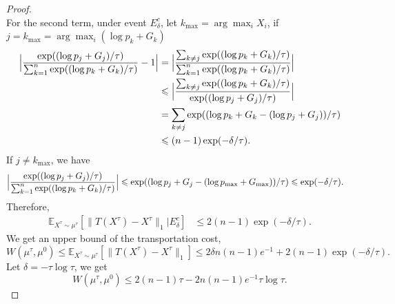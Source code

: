 \begin{proof}
\begin{equation*}
\end{equation*}For the second term, under event $E_{\delta }^{c}$, let $k_{\max} =\arg\max_{i} X_{i}$, if $j=k_{\max} =\arg\max_{i}(\log p_{k} +G_{k})$
\begin{align*}
\Bigl|\frac{\exp((\log p_{j} +G_{j}) /\tau )}{\sum _{k=1}^{n}\exp((\log p_{k} +G_{k}) /\tau )} -1\Bigl| & =\Bigl|\frac{\sum _{k\neq j}\exp((\log p_{k} +G_{k}) /\tau )}{\sum _{k=1}^{n}\exp((\log p_{k} +G_{k}) /\tau )}\Bigl|\\
 & \leqslant \Bigl|\frac{\sum _{k\neq j}\exp((\log p_{k} +G_{k}) /\tau )}{\exp((\log p_{j} +G_{j}) /\tau )}\Bigl|\\
 & =\sum _{k\neq j}\exp((\log p_{k} +G_{k} -(\log p_{j} +G_{j})) /\tau )\\
 & \leqslant ( n-1)\exp( -\delta /\tau ) .
\end{align*}If $j\neq k_{\max}$, we have 
\begin{align*}
\Bigl|\frac{\exp((\log p_{j} +G_{j}) /\tau )}{\sum _{k=1}^{n}\exp((\log p_{k} +G_{k}) /\tau )}\Bigl| & \leqslant \exp((\log p_{j} +G_{j} -(\log p_{\max} +G_{\max})) /\tau ) \leqslant \exp( -\delta /\tau ) .
\end{align*}
Therefore, 
\begin{align*}
\mathbb{E}_{X^{\tau } \sim \mu ^{\tau }}\left[ \| T\left( X^{\tau }\right) -X^{\tau } \| _{1} |E_{\delta }^{c}\right] & \leqslant 2( n-1)\exp( -\delta /\tau ) .
\end{align*}We get an upper bound of the transportation cost,
\begin{equation*}
W\left( \mu ^{\tau } ,\mu ^{0}\right) \leqslant \mathbb{E}_{X^{\tau } \sim \mu ^{\tau }}\left[ \| T\left( X^{\tau }\right) -X^{\tau } \| _{1}\right] \leqslant 2\delta n( n-1) e^{-1} +2( n-1)\exp( -\delta /\tau ) .
\end{equation*}Let $\delta =-\tau \log \tau $, we get 
\begin{equation*}
W\left( \mu ^{\tau } ,\mu ^{0}\right) \leqslant 2( n-1) \tau -2n( n-1) e^{-1} \tau \log \tau .
\end{equation*}
\end{proof}

